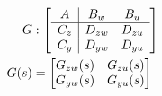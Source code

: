 \begin{align*}
    G    & : \left[
        \begin{array}{c|c c} %
            A   & B_w    & B_u    \\
            \hline %
            C_z & D_{zw} & D_{zu} \\
            C_y & D_{yw} & D_{yu}
        \end{array}
    \right]                        \\
    G(s) & = \begin{bmatrix}
                 G_{zw}(s) & G_{zu}(s) \\
                 G_{yw}(s) & G_{yu}(s) \\
             \end{bmatrix}
\end{align*}

